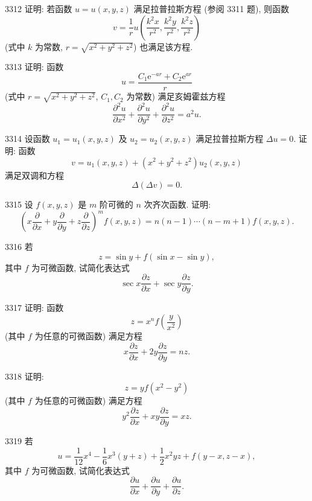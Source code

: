 \begin{prob}[M]{3312}
证明: 若函数 $u = u(x, y, z)$ 满足拉普拉斯方程 (参阅 3311 题), 则函数
\[
v = \frac{1}{r} u\left(\frac{k^2 x}{r^2}, \frac{k^2 y}{r^2}, \frac{k^2 z}{r^2}\right)
\]
(式中 $k$ 为常数, $r = \sqrt{x^2 + y^2 + z^2}$) 也满足该方程.
\end{prob}

\begin{prob}[M]{3313}
证明: 函数
\[
u = \frac{C_1\mathrm{e}^{-ar} + C_2\mathrm{e}^{ar}}{r}
\]
(式中 $r = \sqrt{x^2 + y^2 + z^2}$, $C_1, C_2$ 为常数) 满足亥姆霍兹方程
\[
\frac{\partial^2 u}{\partial x^2} + \frac{\partial^2 u}{\partial y^2} + \frac{\partial^2 u}{\partial z^2} = a^2 u.
\]
\end{prob}

\begin{prob}[M]{3314}
设函数 $u_1 = u_1(x, y, z)$ 及 $u_2 = u_2(x, y, z)$ 满足拉普拉斯方程 $\Delta u = 0$. 证明: 函数
\[
v = u_1(x, y, z) + (x^2 + y^2 + z^2) u_2(x, y, z)
\]
满足双调和方程
\[
\Delta(\Delta v) = 0.
\]
\end{prob}

\begin{prob}[M]{3315}
设 $f(x, y, z)$ 是 $m$ 阶可微的 $n$ 次齐次函数. 证明:
\[
\left(x\frac{\partial}{\partial x} + y\frac{\partial}{\partial y} + z\frac{\partial}{\partial z}\right)^m f(x, y, z) = n(n - 1)\cdots(n - m + 1) f(x, y, z).
\]
\end{prob}

\begin{prob}[M]{3316}
若
\[
z = \sin y + f(\sin x - \sin y),
\]
其中 $f$ 为可微函数, 试简化表达式
\[
\sec x\frac{\partial z}{\partial x} + \sec y\frac{\partial z}{\partial y}.
\]
\end{prob}

\begin{prob}[M]{3317}
证明: 函数
\[
z = x^n f\left(\frac{y}{x^2}\right)
\]
(其中 $f$ 为任意的可微函数) 满足方程
\[
x\frac{\partial z}{\partial x} + 2y\frac{\partial z}{\partial y} = nz.
\]
\end{prob}

\begin{prob}[M]{3318}
证明:
\[
z = y f(x^2 - y^2)
\]
(其中 $f$ 为任意的可微函数) 满足方程
\[
y^2\frac{\partial z}{\partial x} + xy\frac{\partial z}{\partial y} = xz.
\]
\end{prob}

\begin{prob}[M]{3319}
若
\[
u = \frac{1}{12}x^4 - \frac{1}{6}x^3(y + z) + \frac{1}{2}x^2 yz + f(y - x, z - x),
\]
其中 $f$ 为可微函数, 试简化表达式
\[
\frac{\partial u}{\partial x} + \frac{\partial u}{\partial y} + \frac{\partial u}{\partial z}.
\]
\end{prob}

